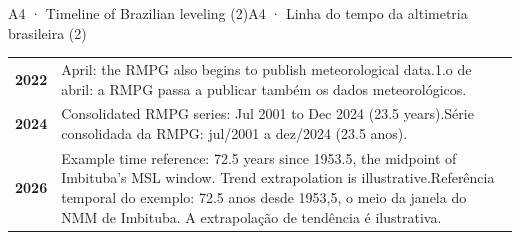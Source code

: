 \documentclass[aspectratio=169,11pt]{beamer}
\newcommand{\tr}[2]{\ifEN#2\else#1\fi}
\begin{document}
\begin{frame}{\tr{A4 · Linha do tempo da altimetria brasileira (2)}{A4 · Timeline of Brazilian leveling (2)}}
\begin{tabular}{@{}lL{11.8cm}@{}}
    \textbf{2022} & \tr{1.o de abril: a RMPG passa a publicar também os dados meteorológicos.}{1 April: the RMPG also begins to publish meteorological data.} \\
    \textbf{2024} & \tr{Série consolidada da RMPG: jul/2001 a dez/2024 (\num{23.5} anos).}{Consolidated RMPG series: Jul 2001 to Dec 2024 (\num{23.5} years).} \\
    \textbf{2026} & \tr{Referência temporal do exemplo: \num{72.5} anos desde 1953,5, o meio da janela do NMM de Imbituba. A extrapolação de tendência é ilustrativa.}{
      Example time reference: \num{72.5} years since 1953.5, the midpoint of Imbituba's MSL window. Trend extrapolation is illustrative.} \\
    \bottomrule
  \end{tabular}
\end{frame}
\end{document}
